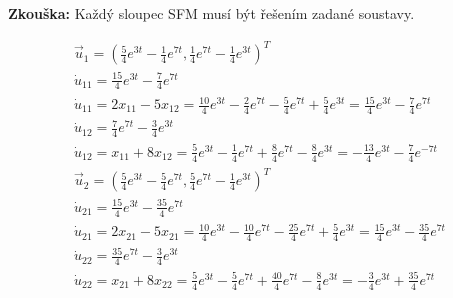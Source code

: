{\bf Zkouška:}\newline
Každý sloupec SFM musí být řešením zadané soustavy.
\begin{center}
\begin{equation*}
 \begin{array}{l}
  \vec{u}_1 = (\frac{5}{4}e^{3t} - \frac{1}{4}e^{7t}, \frac{1}{4}e^{7t} - \frac{1}{4}e^{3t})^T\\
  \dot{u}_{11} = \frac{15}{4}e^{3t} - \frac{7}{4}e^{7t}\\
  \dot{u}_{11} = 2x_{11} - 5x_{12} = \frac{10}{4}e^{3t} - \frac{2}{4}e^{7t} - \frac{5}{4}e^{7t} + \frac{5}{4}e^{3t} = \frac{15}{4}e^{3t} - \frac{7}{4}e^{7t}\\
  \dot{u}_{12} = \frac{7}{4}e^{7t} - \frac{3}{4}e^{3t}\\
  \dot{u}_{12} = x_{11} + 8x_{12} = \frac{5}{4}e^{3t} - \frac{1}{4}e^{7t} + \frac{8}{4}e^{7t} - \frac{8}{4}e^{3t} = -\frac{13}{4}e^{3t} - \frac{7}{4}e^{-7t}\\
  \vec{u}_2 = (\frac{5}{4}e^{3t} - \frac{5}{4}e^{7t}, \frac{5}{4}e^{7t} - \frac{1}{4}e^{3t})^T\\
  \dot{u}_{21} = \frac{15}{4}e^{3t} - \frac{35}{4}e^{7t}\\
  \dot{u}_{21} = 2x_{21} - 5x_{21} = \frac{10}{4}e^{3t} - \frac{10}{4}e^{7t} - \frac{25}{4}e^{7t} + \frac{5}{4}e^{3t} = \frac{15}{4}e^{3t} - \frac{35}{4}e^{7t}\\
  \dot{u}_{22} = \frac{35}{4}e^{7t} - \frac{3}{4}e^{3t}\\
  \dot{u}_{22} = x_{21} + 8x_{22} = \frac{5}{4}e^{3t} - \frac{5}{4}e^{7t} + \frac{40}{4}e^{7t} - \frac{8}{4}e^{3t} = -\frac{3}{4}e^{3t} + \frac{35}{4}e^{7t}
 \end{array}
\end{equation*}
\end{center}

